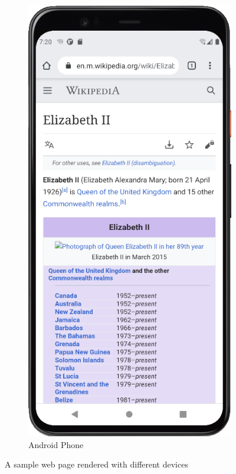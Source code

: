 \begin{figure}[t]
\begin{subfigure}{0.25\textwidth}
  \includegraphics[width=1\textwidth]{intropage_phone}
  \caption{Android Phone}
  \label{intropage_phone}
\end{subfigure}
\caption{A sample web page rendered with different devices}
\label{intropage}
\end{figure}

